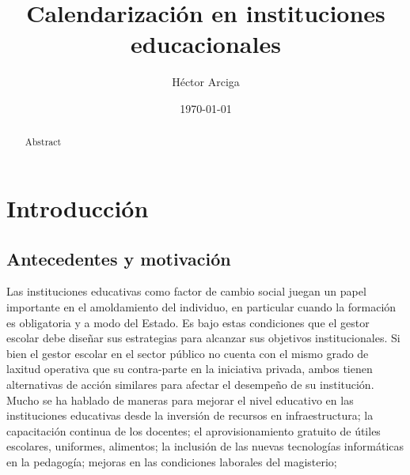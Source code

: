 \documentclass[draft,12pt,headsepline,footsepline,paper=letter]{scrreprt}
\begin{document}
\title{Calendarización en instituciones educacionales}
\author{Héctor Arciga}
\date{\today}

\maketitle

\begin{abstract}
Abstract
\end{abstract}

\begin{spacing}{1}
\tableofcontents
\glsaddall
\printglossaries
\listoffigures
\listoftables
\end{spacing}

\chapter{Introducción}

\section{Antecedentes y motivación}

Las instituciones educativas como factor de cambio social juegan un papel importante en el amoldamiento del individuo, en particular cuando la formación es obligatoria y a modo del Estado. Es bajo estas condiciones que el gestor escolar debe diseñar sus estrategias para alcanzar sus objetivos institucionales.
Si bien el gestor escolar en el sector público no cuenta con el mismo grado de laxitud operativa que su contra-parte en la iniciativa privada, ambos tienen alternativas de acción similares para afectar el desempeño de su institución.
Mucho se ha hablado de maneras para mejorar el nivel educativo en las instituciones educativas desde la inversión de recursos en infraestructura; la capacitación continua de los docentes; el aprovisionamiento gratuito de útiles escolares, uniformes, alimentos; la  inclusión de las nuevas tecnologías informáticas en la pedagogía; mejoras en las condiciones laborales del magisterio;

\end{document}
